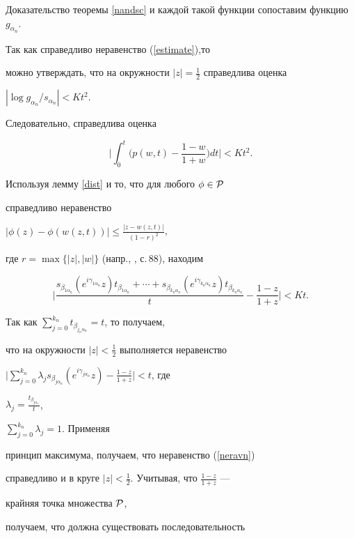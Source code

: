 \begin{pf*}{Доказательство теоремы \ref{nandsc}}
и каждой такой функции сопоставим функцию $g_{\alpha_n}$. 


Так как справедливо неравенство (\ref{estimate}),то


можно утверждать, что на окружности $|z|=\frac12$ справедлива оценка


$|\log{g_{\alpha_n}}/{s_{\alpha_n}}|<K t^2$. 


Следовательно, справедлива оценка


$$


\bigg|\int_{0}^{t}\bigg({p(w,t)-\frac{1-w}{1+w}}\bigg)dt\bigg|<K t^2.


$$


Используя лемму \ref{dist} и то, что для любого $\phi\in \cal P$ 


справедливо неравенство


$|\phi(z)-\phi(w(z,t))|\leqslant\frac{|z-w(z,t)|}{(1-r)^2}$, 


где $r=\max\{|z|,|w|\}$ (напр., \cite{Dur}, с.\,88), находим


\begin{equation}\label{neravn}


\bigg|\frac{s_{\beta_{1\alpha_n}}(e^{i\gamma_{1\alpha_n}}z)


t_{\beta_{1\alpha_n}}+\dotsb+s_{\beta_{k_n\alpha_n}}


(e^{i\gamma_{k_n\alpha_n}}z)


t_{\beta_{k_n\alpha_n}}}t-\frac{1-z}{1+z}\bigg|< K t.


\end{equation}


Так как $\sum\limits_{j=0}^{k_n}t_{\beta_{j_n\alpha_n}}=t$, то получаем,


что на окружности $|z|<\frac12$ выполняется неравенство


$\Big|\sum\limits_{j=0}^{k_n}\lambda_{j}s_{\beta_{j\alpha_n}}


(e^{i\gamma_{j\alpha_n}}z) -\frac{1-z}{1+z}\Big|<t$, где


$\lambda_j=\frac{t_{\beta_{j\alpha_n}}}t$,


$\sum\limits_{j=0}^{k_n}\lambda_j=1$. Применяя


принцип максимума, получаем, что неравенство (\ref{neravn})


справедливо и в круге $|z|<\frac12$. Учитывая, что $\frac{1-z}{1+z}$ ---


крайняя точка множества $\cal P$,


получаем, что должна существовать последовательность



\end{pf*}
